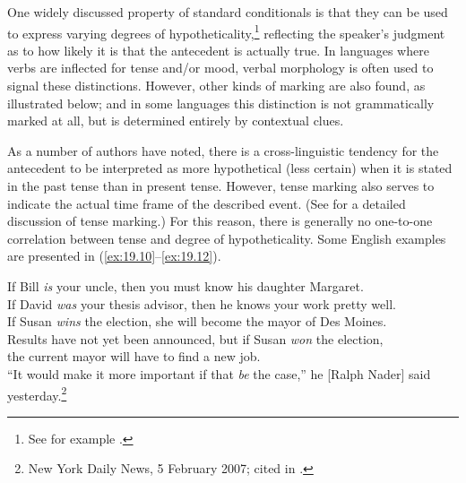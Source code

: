 One widely discussed property of standard conditionals is that they can be used to express varying degrees of hypotheticality,\footnote{See for example \citet{Comrie1986,ThompsonEtAl2007}.} reflecting the speaker’s judgment as to how likely it is that the antecedent is actually true. In languages where verbs are inflected for tense and/or mood, verbal morphology is often used to signal these distinctions. However, other kinds of marking are also found, as illustrated below; and in some languages this distinction is not grammatically marked at all, but is determined entirely by contextual clues.



As a number of authors have noted, there is a cross-linguistic tendency for the antecedent to be interpreted as more hypothetical (less certain) when it is stated in the past tense than in present tense. However, tense marking also serves to indicate the actual time frame of the described event. (See  for a detailed discussion of tense marking.) For this reason, there is generally no one-to-one correlation between tense and degree of hypotheticality. Some English examples are presented in (\ref{ex:19.10}--\ref{ex:19.12}).


\ea \label{ex:19.10}
\ea  If Bill \textit{is} your uncle, then you must know his daughter Margaret.\\
\ex If David \textit{was} your thesis advisor, then he knows your work pretty well.\\
\ex If Susan \textit{wins} the election, she will become the mayor of Des Moines.\\
\ex Results have not yet been announced, but if Susan \textit{won} the election,\\
  the current mayor will have to find a new job.\\
\ex ``It would make it more important if that \textit{be} the case,'' he [Ralph Nader] said yesterday.\footnote{New York Daily News, 5  February 2007; cited in \citet{Gomes2008}.}
                       \z
\z


